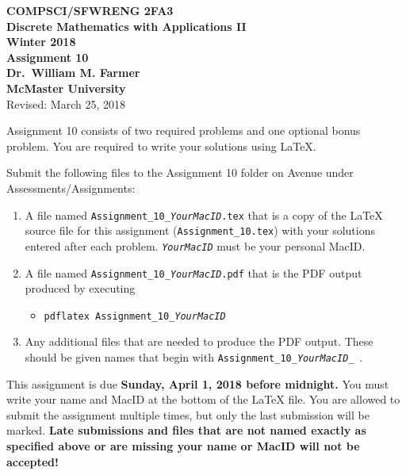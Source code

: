 \documentclass[11pt,fleqn]{article}
\begin{document}
\begin{center}

  {\large \textbf{COMPSCI/SFWRENG 2FA3}}\\[2mm]
  {\large \textbf{Discrete Mathematics with Applications II}}\\[2mm]
  {\large \textbf{Winter 2018}}\\[8mm]
  {\huge \textbf{Assignment 10}}\\[6mm]
  {\large \textbf{Dr.~William M. Farmer}}\\[2mm]
  {\large \textbf{McMaster University}}\\[6mm]
  {\large Revised: March 25, 2018}

\end{center}

\medskip

Assignment 10 consists of two required problems and one optional bonus
problem.  You are required to write your solutions using LaTeX.

Submit the following files to the Assignment 10 folder on Avenue under
Assessments/Assignments:

\begin{enumerate}

  \item A file named \texttt{Assignment\_10\_\emph{YourMacID}.tex} that
    is a copy of the LaTeX source file for this assignment
    (\texttt{Assignment\_10.tex}) with your solutions entered after
    each problem.  \texttt{\emph{YourMacID}} must be your personal
    MacID.

  \item A file named \texttt{Assignment\_10\_\emph{YourMacID}.pdf} that
    is the PDF output produced by executing

    \begin{itemize}

      \item[] \texttt{pdflatex Assignment\_10\_\emph{YourMacID}}

    \end{itemize}

  \item Any additional files that are needed to produce the PDF
    output.  These should be given names that begin with
    \texttt{Assignment\_10\_\emph{YourMacID}\_}\ .

\end{enumerate}

\noindent
This assignment is due \textbf{Sunday, April 1, 2018 before midnight.}
You must write your name and MacID at the bottom of the LaTeX file.
You are allowed to submit the assignment multiple times, but only the
last submission will be marked.  \textbf{Late submissions and files
  that are not named exactly as specified above or are missing your
  name or MacID will not be accepted!}
\end{document}
